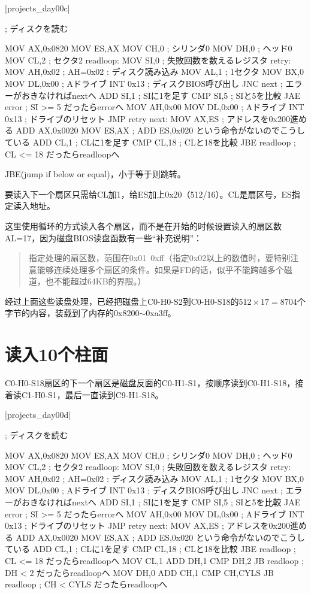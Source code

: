 \dag|projects_day\harib00c|
\begin{code}[label=ipl.nas 本次添加的部分]
; ディスクを読む

		MOV		AX,0x0820
		MOV		ES,AX
		MOV		CH,0			; シリンダ0
		MOV		DH,0			; ヘッド0
		MOV		CL,2			; セクタ2
readloop:
		MOV		SI,0			; 失敗回数を数えるレジスタ
retry:
		MOV		AH,0x02			; AH=0x02 : ディスク読み込み
		MOV		AL,1			; 1セクタ
		MOV		BX,0
		MOV		DL,0x00			; Aドライブ
		INT		0x13			; ディスクBIOS呼び出し
		JNC		next			; エラーがおきなければnextへ
		ADD		SI,1			; SIに1を足す
		CMP		SI,5			; SIと5を比較
		JAE		error			; SI >= 5 だったらerrorへ
		MOV		AH,0x00
		MOV		DL,0x00			; Aドライブ
		INT		0x13			; ドライブのリセット
		JMP		retry
next:
		MOV		AX,ES			; アドレスを0x200進める
		ADD		AX,0x0020
		MOV		ES,AX			; ADD ES,0x020 という命令がないのでこうしている
		ADD		CL,1			; CLに1を足す
		CMP		CL,18			; CLと18を比較
		JBE		readloop		; CL <= 18 だったらreadloopへ
\end{code}

JBE(jump if below or equal)，小于等于则跳转。

要读入下一个扇区只需给CL加1，给ES加上0x20（512/16）。CL是扇区号，ES指定读入地址。

这里使用循环的方式读入各个扇区，而不是在开始的时候设置读入的扇区数AL=17，因为磁盘BIOS读盘函数有一些“补充说明”：
\begin{quote}
  指定处理的扇区数，范围在0x01~0xff（指定0x02以上的数值时，要特别注意能够连续处理多个扇区的条件。如果是FD的话，似乎不能跨越多个磁道，也不能超过64KB的界限。）
\end{quote}

经过上面这些读盘处理，已经把磁盘上C0-H0-S2到C0-H0-S18的$512\times 17=8704$个字节的内容，装载到了内存的0x8200$\sim$0xa3ff。
\section{	读入10个柱面	}
C0-H0-S18扇区的下一个扇区是磁盘反面的C0-H1-S1，按顺序读到C0-H1-S18，接着读C1-H0-S1，最后一直读到C9-H1-S18。

\dag |projects_day\harib00d|
\begin{code}
; ディスクを読む

		MOV		AX,0x0820
		MOV		ES,AX
		MOV		CH,0			; シリンダ0
		MOV		DH,0			; ヘッド0
		MOV		CL,2			; セクタ2
readloop:
		MOV		SI,0			; 失敗回数を数えるレジスタ
retry:
		MOV		AH,0x02			; AH=0x02 : ディスク読み込み
		MOV		AL,1			; 1セクタ
		MOV		BX,0
		MOV		DL,0x00			; Aドライブ
		INT		0x13			; ディスクBIOS呼び出し
		JNC		next			; エラーがおきなければnextへ
		ADD		SI,1			; SIに1を足す
		CMP		SI,5			; SIと5を比較
		JAE		error			; SI >= 5 だったらerrorへ
		MOV		AH,0x00
		MOV		DL,0x00			; Aドライブ
		INT		0x13			; ドライブのリセット
		JMP		retry
next:
		MOV		AX,ES			; アドレスを0x200進める
		ADD		AX,0x0020
		MOV		ES,AX			; ADD ES,0x020 という命令がないのでこうしている
		ADD		CL,1			; CLに1を足す
		CMP		CL,18			; CLと18を比較
		JBE		readloop		; CL <= 18 だったらreadloopへ
		MOV		CL,1
		ADD		DH,1
		CMP		DH,2
		JB		readloop		; DH < 2 だったらreadloopへ
		MOV		DH,0
		ADD		CH,1
		CMP		CH,CYLS
		JB		readloop		; CH < CYLS だったらreadloopへ
\end{code}

